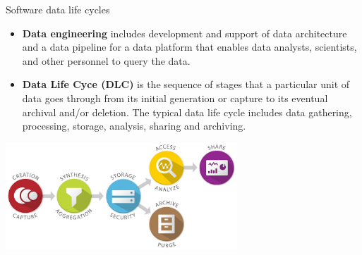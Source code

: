 \begin{frame}{Software data life cycles}%
    \begin{itemize}
        \item \textbf{Data engineering} includes development and support of data architecture and a data pipeline for a data platform that enables data analysts, scientists, and other personnel to query the data.
        
        \item \textbf{Data Life Cyce (DLC)} is the sequence of stages that a particular unit of data goes through from its initial generation 
        or capture to its eventual archival and/or deletion. The typical data life cycle includes data gathering, processing, storage, analysis, sharing and archiving. 

    \end{itemize}
    \vspace{-1ex}
    \centering
    \includegraphics[width=0.65\textwidth]{pics/data_lifecycle_illust.jpg}
\end{frame}

